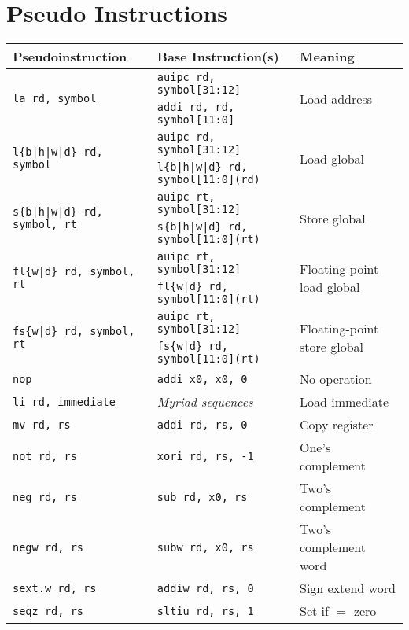 \section*{Pseudo Instructions}
\small
\begin{tabular}{l | l | l} \hline
Pseudoinstruction & Base Instruction(s) & Meaning \\ \hline

\multirow{2}{*}{\tt la rd, symbol} & {\tt auipc rd, symbol[31:12]} & \multirow{2}{*}{Load address} \\
                                   & {\tt addi rd, rd, symbol[11:0]} \\
\multirow{2}{*}{\tt l\{b|h|w|d\} rd, symbol} & {\tt auipc rd, symbol[31:12]} & \multirow{2}{*}{Load global} \\
                                           & {\tt l\{b|h|w|d\} rd, symbol[11:0](rd)} \\
\multirow{2}{*}{\tt s\{b|h|w|d\} rd, symbol, rt} & {\tt auipc rt, symbol[31:12]} & \multirow{2}{*}{Store global} \\
                                               & {\tt s\{b|h|w|d\} rd, symbol[11:0](rt)} \\
\multirow{2}{*}{\tt fl\{w|d\} rd, symbol, rt} & {\tt auipc rt, symbol[31:12]} & \multirow{2}{*}{Floating-point load global} \\
                                            & {\tt fl\{w|d\} rd, symbol[11:0](rt)} \\
\multirow{2}{*}{\tt fs\{w|d\} rd, symbol, rt} & {\tt auipc rt, symbol[31:12]} & \multirow{2}{*}{Floating-point store global} \\
                                            & {\tt fs\{w|d\} rd, symbol[11:0](rt)} \\
\hline
{\tt nop} & {\tt addi x0, x0, 0} & No operation \\
{\tt li rd, immediate} & {\em Myriad sequences} & Load immediate \\
{\tt mv rd, rs} & {\tt addi rd, rs, 0} & Copy register \\
{\tt not rd, rs} & {\tt xori rd, rs, -1} & One's complement \\
{\tt neg rd, rs} & {\tt sub rd, x0, rs} & Two's complement \\
{\tt negw rd, rs} & {\tt subw rd, x0, rs} & Two's complement word \\
{\tt sext.w rd, rs} & {\tt addiw rd, rs, 0} & Sign extend word \\
{\tt seqz rd, rs} & {\tt sltiu rd, rs, 1} & Set if $=$ zero \\

\end{tabular}
